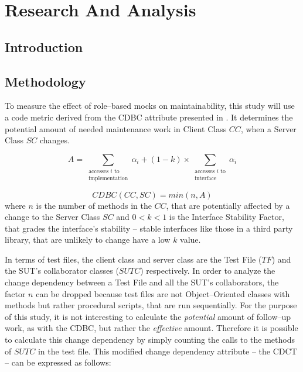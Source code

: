\chapter{Research And Analysis}

\section{Introduction}

\section{Methodology}
To measure the effect of role–based mocks on maintainability, this study will use a code metric derived from the \ac{CDBC} attribute presented in \cite{Hitz:1995}. It determines the potential amount of needed maintenance work in Client Class $CC$, when a Server Class $SC$ changes.

\begin{equation*}
A = \sum_{\substack{\text{accesses $i$ to} \\ \text{implementation}}} \alpha_i + (1 - k) \times \sum_{\substack{\text{accesses $i$ to} \\ \text{interface}}} \alpha_i
\end{equation*}

\begin{equation*}
CDBC(CC, SC)= min(n, A)
\end{equation*}
where $n$ is the number of methods in the $CC$, that are potentially affected by a change to the Server Class $SC$ and $0 < k < 1$ is the Interface Stability Factor, that grades the interface's stability – stable interfaces like those in a third party library, that are unlikely to change have a low $k$ value.

In terms of test files, the client class and server class are the Test File ($TF$) and the \ac{SUT}'s collaborator classes ($SUTC$) respectively. In order to analyze the change dependency between a Test File and all the \ac{SUT}'s collaborators, the factor $n$ can be dropped because test files are not Object–Oriented classes with methods but rather procedural scripts, that are run sequentially. For the purpose of this study, it is not interesting to calculate the \emph{potential} amount of follow–up work, as with the \ac{CDBC}, but rather the \emph{effective} amount. Therefore it is possible to calculate this change dependency by simply counting the calls to the methods of $SUTC$ in the test file. This modified change dependency attribute – the \ac{CDCT} – can be expressed as follows:

